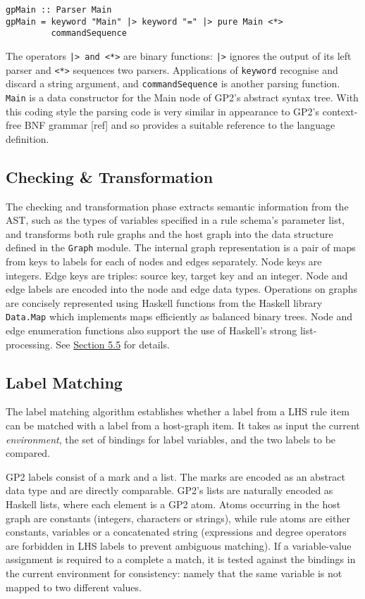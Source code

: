 \begin{verbatim}
gpMain :: Parser Main
gpMain = keyword "Main" |> keyword "=" |> pure Main <*> 
         commandSequence
\end{verbatim}

The operators \texttt{|> and <*>} are binary functions: \texttt{|>} ignores the output of its left parser and \texttt{<*>} sequences two parsers. Applications of \texttt{keyword} recognise and discard a string argument, and \texttt{commandSequence} is another parsing function. \texttt{Main} is a data constructor for the Main node of GP2's abstract syntax tree. With this coding style the parsing code is very similar in appearance to GP2's context-free BNF grammar [ref] and so provides a suitable reference to the language definition.

\subsection{Checking \& Transformation}

The checking and transformation phase extracts semantic information from the AST, such as the types of variables specified in a rule schema's parameter list, and transforms both rule graphs and the host graph into the data structure defined in the \texttt{Graph} module. The internal graph representation is a pair of maps from keys to labels for each of nodes and edges separately. Node keys are integers. Edge keys are triples: source key, target key and an integer. Node and edge labels are encoded into the node and edge data types. Operations on graphs are concisely represented using Haskell functions from the Haskell library \texttt{Data.Map} which implements maps efficiently as balanced binary trees. Node and edge enumeration functions also support the use of Haskell's strong list-processing. See \hyperref[sec:graph-match]{Section 5.5} for details.

\subsection{Label Matching}
The label matching algorithm establishes whether a label from a LHS rule item can be matched with a label from a host-graph item. It takes as input the current \textit{environment}, the set of bindings for label variables, and the two labels to be compared. 

GP2 labels consist of a mark and a list. The marks are encoded as an abstract data type and are directly comparable. GP2's lists are naturally encoded as Haskell lists, where each element is a GP2 atom. Atoms occurring in the host graph are constants (integers, characters or strings), while rule atoms are either constants, variables or a concatenated string (expressions and degree operators are forbidden in LHS labels to prevent ambiguous matching). If a variable-value assignment is required to a complete a match, it is tested against the bindings in the current environment for consistency: namely that the same variable is not mapped to two different values. 

